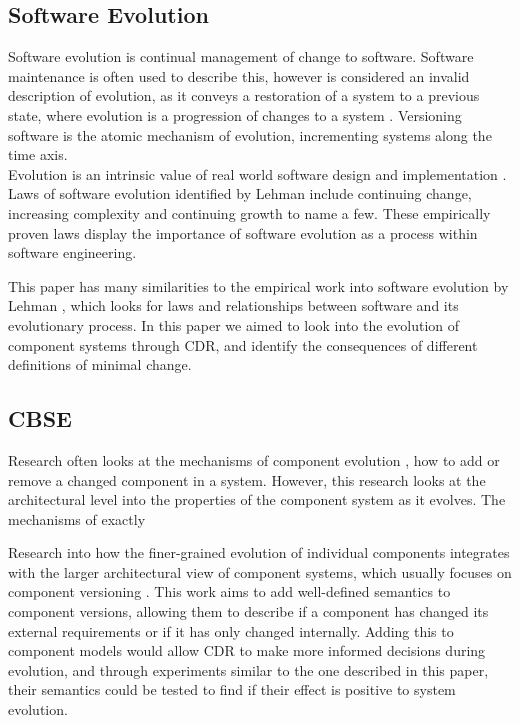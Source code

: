 \subsection{Software Evolution}
Software evolution is continual management of change to software. 
Software maintenance is often used to describe this,
however is considered an invalid description of evolution, as it conveys a
restoration of a system to a previous state, where evolution is a progression
of changes to a system \citep{lehman_software_2006}. Versioning software is the atomic mechanism of evolution, 
incrementing systems along the time axis.\\ 
Evolution is an intrinsic value of real world software
design and implementation \citep{lehman_programs_1980}. Laws of software
evolution identified by Lehman include continuing change, increasing complexity and
continuing growth \citep{lehman_rules_2001} to name a few. These empirically proven laws
display the importance of software evolution as a process within software
engineering.

This paper has many similarities to the empirical work into software evolution by Lehman \citep{lehman1980},
which looks for laws and relationships between software and its evolutionary process.
In this paper we aimed to look into the evolution of component systems through CDR,
and identify the consequences of different definitions of minimal change. 


\subsection{CBSE}

Research often looks at the mechanisms of component evolution \citep{Wang2006}, how to add or remove a changed component in a system.  
However, this research looks at the architectural level into the properties of the component system as it evolves.
The mechanisms of exactly 

Research into how the finer-grained evolution of individual components integrates with the larger architectural view of component systems, which
usually focuses on component versioning \citep{Bauml2009,Stuckenholz2005}.
This work aims to add well-defined semantics to component versions, 
allowing them to describe if a component has changed its external requirements or if it has only changed internally.
Adding this to component models would allow CDR to make more informed decisions during evolution, 
and through experiments similar to the one described in this paper,
their semantics could be tested to find if their effect is positive to system evolution.

